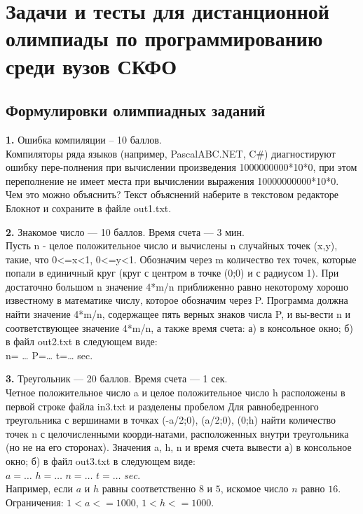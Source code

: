 \chapter{Задачи и тесты для дистанционной олимпиады по программированию среди вузов СКФО}\label{akm3-chap}





\section{Формулировки олимпиадных заданий}

\textbf{1.} Ошибка компиляции – 10 баллов.\\
Компиляторы ряда языков (например, PascalABC.NET, C\#) диагностируют ошибку пере-полнения при вычислении произведения
1000000000*10*0,
при этом переполнение не имеет места при вычислении выражения 10000000000*10*0.
\\
Чем это можно объяснить? Текст объяснений наберите в текстовом редакторе Блокнот и сохраните в файле out1.txt.


\textbf{2.} Знакомое число --- 10 баллов. Время счета --- 3 мин.\\
Пусть n - целое положительное число и вычислены n случайных точек (x,y), такие, что 0<=x<1, 0<=y<1. Обозначим через m количество тех точек, которые попали в единичный круг (круг с центром в точке (0;0) и с радиусом 1). При достаточно большом n значение 4*m/n приближенно равно некоторому хорошо известному в математике числу, которое обозначим через P.
Программа должна найти значение 4*m/n, содержащее пять верных знаков числа P, и вы-вести n и соответствующее значение 4*m/n, а также время счета: а) в консольное окно; б) в файл out2.txt в следующем виде:\\
n= …         P=…         t=…    sec.


\textbf{3.} Треугольник --- 20 баллов. Время счета --- 1 сек.\\
Четное положительное число a и целое положительное число h расположены в первой строке файла in3.txt и разделены пробелом Для равнобедренного треугольника с вершинами в точках (-a/2;0), (a/2;0), (0;h) найти количество точек n с целочисленными коорди-натами, расположенных внутри треугольника (но не на его сторонах). Значения a, h, n и время счета вывести а) в консольное окно; б) в файл out3.txt в следующем виде:\\
$a = \ldots$ $h= \ldots$ $n= \ldots$ $t= \ldots$ $sec$.\\
Например, если $a$ и $h$ равны соответственно $8$ и $5$, искомое число $n$ равно $16$.\\
Ограничения: $1<a<=1000$, $1<h<=1000$.


